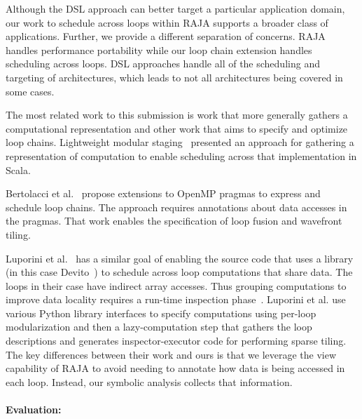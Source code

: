 \documentclass{article}
\begin{document}
Although the DSL approach can better target a particular application domain,
our work to schedule across loops within RAJA supports a broader class of
applications.
Further, we provide a different separation of concerns. RAJA handles
performance portability while our loop chain extension handles scheduling
across loops.
DSL approaches handle all of the scheduling and targeting of architectures,
which leads to not all architectures being covered in some cases.

The most related work to this submission is work that more generally gathers
a computational representation and other work that aims to specify and
optimize loop chains.
Lightweight modular staging~\cite{LMS2012} presented an approach for gathering 
a representation of computation to enable scheduling across that implementation
in Scala.

Bertolacci et al.~\cite{Bertolacci2016,Bertolacci2019} propose extensions to
OpenMP pragmas to express and schedule loop chains.
The approach requires annotations about data accesses in the pragmas.
That work enables the specification of loop fusion and wavefront tiling. 

Luporini et al.~\cite{Luporini2019} has a similar goal of enabling the source
code that uses a library  (in this case Devito~\cite{Luporini2018}) to
schedule across loop computations that share data.
The loops in their case have indirect array accesses.
Thus grouping computations to improve data locality requires a run-time
inspection phase~\cite{Strout14IPDPS}.
Luporini et al. use various Python library interfaces to specify computations
using per-loop modularization and then a lazy-computation step that gathers
the loop descriptions and generates inspector-executor code for performing 
sparse tiling.
The key differences between their work and ours is that we leverage the view 
capability of RAJA to avoid needing to annotate how data is being accessed
in each loop.  
Instead, our symbolic analysis collects that information.


\paragraph{Evaluation:}
\end{document}

